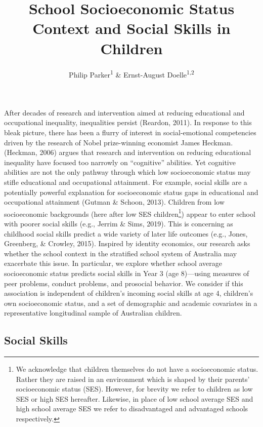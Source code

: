 \documentclass[
  english,
  man]{apa6}
\title{School Socioeconomic Status Context and Social Skills in Children}
\author{Philip Parker\textsuperscript{1} \& Ernst-August Doelle\textsuperscript{1,2}}
\date{}
\affiliation{\vspace{0.5cm}\textsuperscript{1} Institute for Positive Psychology and Education, Australian Catholic University\\\textsuperscript{2} Konstanz Business School}
\begin{document}
\maketitle

After decades of research and intervention aimed at reducing educational and occupational inequality, inequalities persist (Reardon, 2011). In response to this bleak picture, there has been a flurry of interest in social-emotional competencies driven by the research of Nobel prize-winning economist James Heckman. (Heckman, 2006) argues that research and intervention on reducing educational inequality have focused too narrowly on ``cognitive'' abilities. Yet cognitive abilities are not the only pathway through which low socioeconomic status may stifle educational and occupational attainment. For example, social skills are a potentially powerful explanation for socioeconomic status gaps in educational and occupational attainment (Gutman \& Schoon, 2013). Children from low socioeconomic backgrounds (here after low SES children\footnote{We acknowledge that children themselves do not have a socioeconomic status. Rather they are raised in an environment which is shaped by their parents' socioeconomic status (SES). However, for brevity we refer to children as low SES or high SES hereafter. Likewise, in place of low school average SES and high school average SES we refer to disadvantaged and advantaged schools respectively.}) appear to enter school with poorer social skills (e.g., Jerrim \& Sims, 2019). This is concerning as childhood social skills predict a wide variety of later life outcomes (e.g., Jones, Greenberg, \& Crowley, 2015). Inspired by identity economics, our research asks whether the school context in the stratified school system of Australia may exacerbate this issue. In particular, we explore whether school average socioeconomic status predicts social skills in Year 3 (age 8)---using measures of peer problems, conduct problems, and prosocial behavior. We consider if this association is independent of children's incoming social skills at age 4, children's own socioeconomic status, and a set of demographic and academic covariates in a representative longitudinal sample of Australian children.

\hypertarget{social-skills}{%
\subsection{Social Skills}\label{social-skills}}
\end{document}
